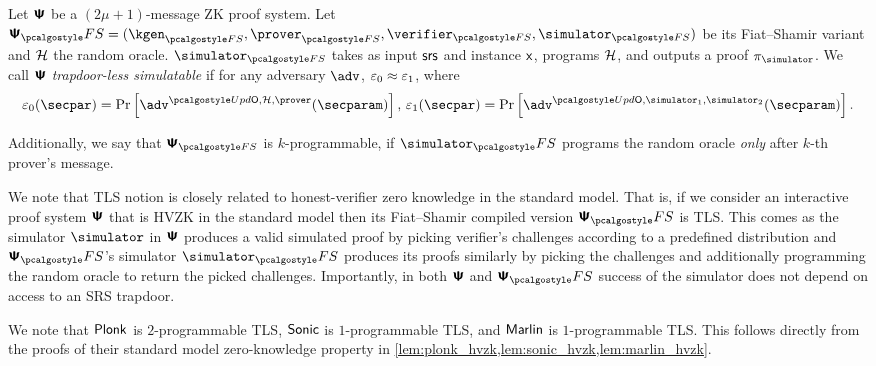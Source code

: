 \begin{definition}
  \label{def:tls}
  Let $\bm{\mathsf{\Psi}}$ be a $(2\mu + 1)$-message ZK proof system. Let
  $\ps_\fs= (\kgen_{\fs}, \prover_{\fs}, \verifier_{\fs}, \simulator_{\fs})$ be its
  Fiat--Shamir variant and $\mathcal{H}$ the random oracle. $\simulator_{\fs}$ takes as input
  $\mathsf{srs}$ and instance $\mathsf{x}$, programs $\mathcal{H}$, and outputs a proof
  $\zkproof_\simulator$.  We call $\bm{\mathsf{\Psi}}$ \emph{trapdoor-less simulatable} if for any
  adversary $\adv$, $\varepsilon_0 \approx \varepsilon_1$, where
  \begin{align*}
    \eps_0 (\secpar) = \Pr\left[ \adv^{\initU, \ro, \prover} (\secparam) \right],\,
    \eps_1 (\secpar)=  \Pr \left[\adv^{\initU, \simulator_1, \simulator_2} (\secparam) \right].
  \end{align*}
  
  Additionally, we say that $\ps_{\fs}$ is $k$-programmable, if $\simulator_\fs$
  programs the random oracle \emph{only} after $k$-th prover's message.
  \end{definition}

  
\begin{remark}
  We note that TLS notion is closely related to honest-verifier zero knowledge in the
  standard model. That is, if we consider an interactive proof system $\bm{\mathsf{\Psi}}$
  that is HVZK in the standard model then its Fiat--Shamir compiled version
  $\proofsystem_\fs$ is TLS. This comes as the simulator $\simulator$ in
  $\bm{\mathsf{\Psi}}$ produces a valid simulated proof by picking verifier's challenges
  according to a predefined distribution and $\proofsystem_\fs$'s simulator
  $\simulator_\fs$ produces its proofs similarly by picking the challenges and
  additionally programming the random oracle to return the picked
  challenges. Importantly, in both $\bm{\mathsf{\Psi}}$ and $\proofsystem_\fs$ success of
  the simulator does not depend on access to an SRS trapdoor.
\end{remark}

We note that $\textnormal{\textsf{Plonk}}$ is $2$-programmable TLS, ${\textnormal{\textsf{Sonic}}}$ is $1$-programmable TLS,
and ${\textnormal{\textsf{Marlin}}}$ is $1$-programmable TLS. This follows directly from the proofs of
their standard model zero-knowledge property in
\cref{lem:plonk_hvzk,lem:sonic_hvzk,lem:marlin_hvzk}. 





